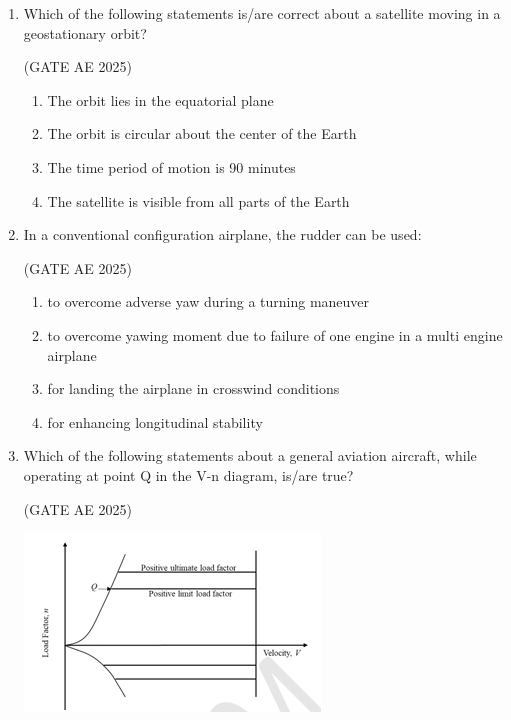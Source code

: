 \documentclass[journal,12pt,onecolumn]{IEEEtran}
\theoremstyle{remark}
\begin{document}
\begin{flushleft}
\begin{enumerate}
\begin{enumerate}
\end{enumerate}
    
\item  Which of the following statements is/are correct about a satellite moving in a geostationary orbit? 

\hfill (GATE AE 2025)

\begin{enumerate}
    \item The orbit lies in the equatorial plane
    \item The orbit is circular about the center of the Earth
    \item The time period of motion is 90 minutes
    \item The satellite is visible from all parts of the Earth
\end{enumerate}

\item  In a conventional configuration airplane, the rudder can be used:

\hfill (GATE AE 2025)

\begin{enumerate}
    \item to overcome adverse yaw during a turning maneuver
    \item to overcome yawing moment due to failure of one engine in a multi engine airplane
    \item for landing the airplane in crosswind conditions
    \item for enhancing longitudinal stability
\end{enumerate}

\item  Which of the following statements about a general aviation aircraft, while operating at point Q in the V-n diagram, is/are true?

\hfill (GATE AE 2025)

\begin{center}
\includegraphics[width=0.5\columnwidth]{figs/pic.png}
\caption{}
    \label{fig:placeholder}
\end{center}


\end{enumerate}
\end{flushleft}
\end{document}
